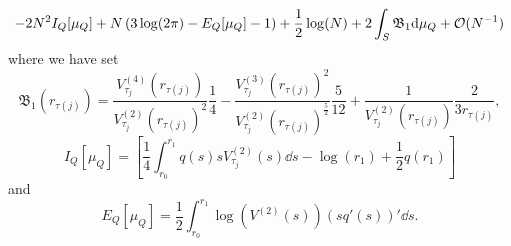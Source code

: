 \begin{teorema}
	\begin{equation}
	- 2 N^2 I_Q[\mu_Q] + N \left( 3\log(2\pi) - E_Q[\mu_Q] - 1\right) + \frac{1}{2} \log(N) + 2 \int_S \mathfrak{B}_1 \mathrm{d} \mu_Q + \mathcal{O}(N^{-1})
	\end{equation}
	where we have set
\begin{equation}
	\mathfrak{B}_1(r_{\tau(j)})  = \frac{V^{(4)}_{\tau_j}(r_{\tau(j)})}{V^{(2)}_{\tau_j}(r_{\tau(j)})^2} \frac{1}{4} - \frac{V^{(3)}_{\tau_j}(r_{\tau(j)})^2}{V^{(2)}_{\tau_j}(r_{\tau(j)})^{\frac{5}{2}}} \frac{5}{12} + \frac{1}{V^{(2)}_{\tau_j}(r_{\tau(j)})} \frac{2}{3 r_{\tau(j)}},
\end{equation}
\begin{equation}
	I_Q[\mu_Q] = \left[\frac{1}{4} \int_{r_0}^{r_1} q(s) s V^{(2)}_{\tau_j}(s) \dd s- \log(r_1) + \frac{1}{2} q(r_1) \right] 
\end{equation}
and
\begin{equation}
	E_Q[\mu_Q] = \frac{1}{2} \int_{r_0}^{r_1} \log(V^{(2)}(s)) (sq'(s))' \dd s.
\end{equation}
\end{teorema}

